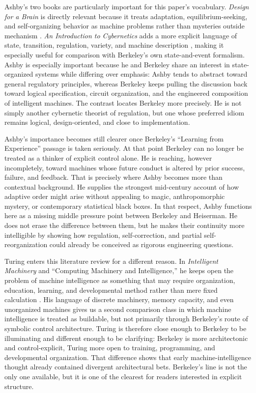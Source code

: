 \documentclass[11pt]{article}
\begin{document}
Ashby's two books are particularly important for this paper's vocabulary. \emph{Design for a Brain} is directly relevant because it treats adaptation, equilibrium-seeking, and self-organizing behavior as machine problems rather than mysteries outside mechanism \citep{ashby1952design}. \emph{An Introduction to Cybernetics} adds a more explicit language of state, transition, regulation, variety, and machine description \citep{ashby1956introduction}, making it especially useful for comparison with Berkeley's own state-and-event formalism. Ashby is especially important because he and Berkeley share an interest in state-organized systems while differing over emphasis: Ashby tends to abstract toward general regulatory principles, whereas Berkeley keeps pulling the discussion back toward logical specification, circuit organization, and the engineered composition of intelligent machines. The contrast locates Berkeley more precisely. He is not simply another cybernetic theorist of regulation, but one whose preferred idiom remains logical, design-oriented, and close to implementation.

Ashby's importance becomes still clearer once Berkeley's ``Learning from Experience'' passage is taken seriously. At that point Berkeley can no longer be treated as a thinker of explicit control alone. He is reaching, however incompletely, toward machines whose future conduct is altered by prior success, failure, and feedback. That is precisely where Ashby becomes more than contextual background. He supplies the strongest mid-century account of how adaptive order might arise without appealing to magic, anthropomorphic mystery, or contemporary statistical black boxes. In that respect, Ashby functions here as a missing middle pressure point between Berkeley and Heiserman. He does not erase the difference between them, but he makes their continuity more intelligible by showing how regulation, self-correction, and partial self-reorganization could already be conceived as rigorous engineering questions.

Turing enters this literature review for a different reason. In \emph{Intelligent Machinery} and ``Computing Machinery and Intelligence,'' he keeps open the problem of machine intelligence as something that may require organization, education, learning, and developmental method rather than mere fixed calculation \citep{turing1948intelligent,turing1950computing}. His language of discrete machinery, memory capacity, and even unorganized machines gives us a second comparison class in which machine intelligence is treated as buildable, but not primarily through Berkeley's route of symbolic control architecture. Turing is therefore close enough to Berkeley to be illuminating and different enough to be clarifying: Berkeley is more architectonic and control-explicit, Turing more open to training, programming, and developmental organization. That difference shows that early machine-intelligence thought already contained divergent architectural bets. Berkeley's line is not the only one available, but it is one of the clearest for readers interested in explicit structure.
\end{document}
